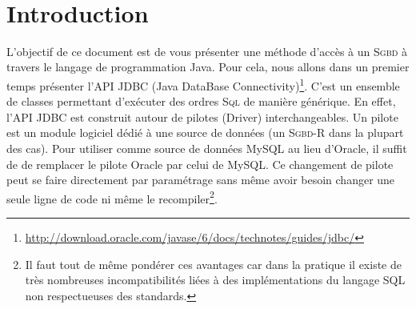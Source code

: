 \documentclass[a4paper,11pt]{article}
\date{}
\begin{document}

\newlength{\niveauZero}
\newlength{\niveauUn}
\newlength{\niveauDeux}
\newlength{\niveauTrois}
\newlength{\niveauQuatre}
\newlength{\niveauCinq}

\newlength{\colonneZero}
\newlength{\colonneUn}
\newlength{\colonneDeux}
\newlength{\colonneTrois}
\newlength{\colonneQuatre}
\newlength{\colonneCinq}


{\centering
    \mbox{
    }
}\\[0.4cm]
\section{Introduction}
L'objectif de ce document est de vous présenter une méthode d'accès à un \textsc{Sgbd} à travers le langage de  
programmation Java. Pour cela, nous allons dans un premier temps présenter l'API JDBC (Java DataBase  
Connectivity)\footnote{\url{http://download.oracle.com/javase/6/docs/technotes/guides/jdbc/}}. C'est un ensemble de  
classes permettant d'exécuter des ordres \textsc{Sql} de manière générique. En effet, l'API JDBC est construit autour 
de pilotes (Driver) interchangeables. Un pilote est un module logiciel  dédié à une source de données (un 
\textsc{Sgbd-R} dans la plupart des cas). Pour utiliser comme source de  données MySQL au lieu d'Oracle, il suffit de de
 remplacer le pilote Oracle par celui de MySQL.  Ce changement de pilote peut se faire directement par paramétrage sans 
 même avoir besoin changer une seule ligne  de code ni même le recompiler\footnote{Il faut tout de même pondérer ces 
 avantages car dans la pratique il existe  de très nombreuses incompatibilités liées à des implémentations du langage 
 \textsc{SQL} non respectueuses des standards.}.
\end{document}
